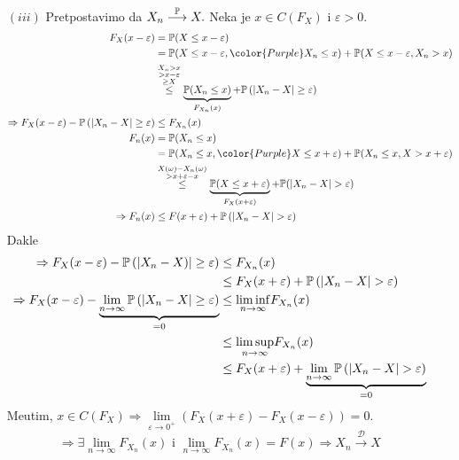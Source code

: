 \documentclass{article}
\newcommand{\mylimsup}{\underset{n\to\infty}{\lim\sup}}
\newcommand{\myliminf}{\underset{n\to\infty}{\lim\inf}}
\begin{document}
\begin{itemize}
    \item[\((iii)\)] Pretpostavimo da \(X_n\overset{\Bbb P}{\longrightarrow}X.\) Neka je \(x\in C\left(F_X\right)\) i \(\varepsilon>0.\) \[\begin{aligned}F_X(x-\varepsilon)&=\Bbb P(X\le x-\varepsilon)\\&=\Bbb P(X\le x-\varepsilon,{\color{Purple}X_n\le x})+\Bbb P(X\le x-\varepsilon,X_n>x)\\&\overset{\substack{X_n>x\\>x-\varepsilon\\\ge X}}{\le}\underbrace{\Bbb P(X_n\le x)}_{F_{X_n}(x)}+\Bbb P\left(|X_n-X|\ge\varepsilon\right)\\\Rightarrow F_X(x-\varepsilon)-\Bbb P\left(|X_n-X|\ge\varepsilon\right)&\le F_{X_n}(x)\\F_n(x)&=\Bbb P(X_n\le x)\\&=\Bbb P(X_n\le x,{\color{Purple}X\le x+\varepsilon})+\Bbb P(X_n\le x,X>x+\varepsilon)\\&\overset{\substack{X(\omega)-X_n(\omega)\\>x+\varepsilon-x}}{\le}\underbrace{\Bbb P(X\le x+\varepsilon)}_{F_X(x+\varepsilon)}+\Bbb P(|X_n-X|>\varepsilon)\\\Rightarrow F_n(x)&\le F(x+\varepsilon)+\Bbb P\left(|X_n-X|>\varepsilon\right)\end{aligned}\] Dakle \[\begin{aligned}\Rightarrow F_X(x-\varepsilon)-\Bbb P\left(|X_n-X)|\ge\varepsilon\right)&\le F_{X_n}(x)\\&\le F_X(x+\varepsilon)+\Bbb P\left(|X_n-X|>\varepsilon\right)\\\Rightarrow F_X(x-\varepsilon)-\underbrace{\lim_{n\to\infty}\Bbb P\left(|X_n-X|\ge\varepsilon\right)}_{=0}&\le\myliminf F_{X_n}(x)\\&\le\mylimsup  F_{X_n}(x)\\&\le F_X(x+\varepsilon)+\underbrace{\lim_{n\to\infty}\Bbb P\left(|X_n-X|>\varepsilon\right)}_{=0}\end{aligned}\] Me\dj{}utim, \(x\in C\left(F_X\right)\Rightarrow\lim\limits_{\varepsilon\to 0^+}(F_X(x+\varepsilon)-F_X(x-\varepsilon))=0.\) \[\Rightarrow\exists\lim_{n\to\infty}F_{X_n}(x)\text{ i }\lim_{n\to\infty}F_{X_n}(x)=F(x)\Rightarrow X_n\overset{\mathcal D}{\longrightarrow}X\]
\end{itemize}
\end{document}
